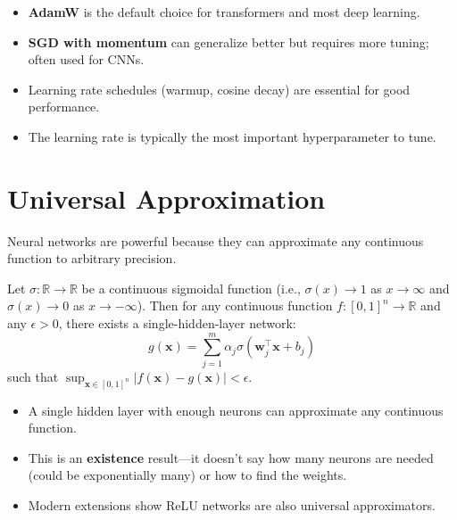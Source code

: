 \begin{remark}
    \begin{itemize}
        \item \textbf{AdamW} is the default choice for transformers and most deep learning.
        \item \textbf{SGD with momentum} can generalize better but requires more tuning; often used for CNNs.
        \item Learning rate schedules (warmup, cosine decay) are essential for good performance.
        \item The learning rate is typically the most important hyperparameter to tune.
    \end{itemize}
\end{remark}

\section{Universal Approximation}

Neural networks are powerful because they can approximate any continuous function to arbitrary precision.

\begin{theorem}
    Let $\sigma: \mathbb{R} \to \mathbb{R}$ be a continuous sigmoidal function (i.e., $\sigma(x) \to 1$ as $x \to \infty$ and $\sigma(x) \to 0$ as $x \to -\infty$). Then for any continuous function $f: [0,1]^n \to \mathbb{R}$ and any $\epsilon > 0$, there exists a single-hidden-layer network:
    \[
        g(\mathbf{x}) = \sum_{j=1}^{m} \alpha_j \sigma(\mathbf{w}_j^\top \mathbf{x} + b_j)
    \]
    such that $\sup_{\mathbf{x} \in [0,1]^n} |f(\mathbf{x}) - g(\mathbf{x})| < \epsilon$.
\end{theorem}

\begin{remark}
    \begin{itemize}
        \item A single hidden layer with enough neurons can approximate any continuous function.
        \item This is an \textbf{existence} result---it doesn't say how many neurons are needed (could be exponentially many) or how to find the weights.
        \item Modern extensions show ReLU networks are also universal approximators.
    \end{itemize}
\end{remark}

